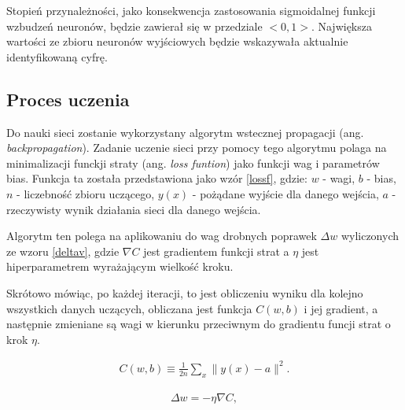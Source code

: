 Stopień przynależności, jako konsekwencja zastosowania sigmoidalnej funkcji wzbudzeń neuronów, będzie zawierał się w przedziale $<0, 1>$. Największa wartości ze zbioru neuronów wyjściowych będzie wskazywała aktualnie identyfikowaną cyfrę.

\subsection{Proces uczenia}
Do nauki sieci zostanie wykorzystany algorytm wstecznej propagacji (ang. \textit{backpropagation}). Zadanie uczenie sieci przy pomocy tego algorytmu polaga na minimalizacji funckji straty (ang. \textit{loss funtion}) jako funkcji wag i parametrów bias. Funkcja ta została przedstawiona jako wzór  \ref{lossf}, gdzie: $w$ - wagi, $b$ - bias, $n$ - liczebność zbioru uczącego, $y(x)$ - pożądane wyjście dla danego wejścia,  $a$ - rzeczywisty wynik działania sieci dla danego wejścia.

Algorytm ten polega na aplikowaniu do wag drobnych poprawek $\Delta w$ wyliczonych ze wzoru \ref{deltav}, gdzie $ \nabla C$ jest gradientem funkcji strat a $\eta$ jest hiperparametrem wyrażającym wielkość kroku. 

Skrótowo mówiąc, po każdej iteracji, to jest obliczeniu wyniku dla kolejno wszystkich danych uczących, obliczana jest funkcja $C(w,b)$ i jej gradient, a następnie zmieniane są wagi w kierunku przeciwnym do  gradientu funcji strat o krok $\eta$.

\begin{eqnarray}  C(w,b) \equiv
\frac{1}{2n} \sum_x \| y(x) - a\|^2.
\label{lossf}
\end{eqnarray}

\begin{eqnarray}
\Delta w = -\eta \nabla C,
\label{deltav}
\end{eqnarray}


